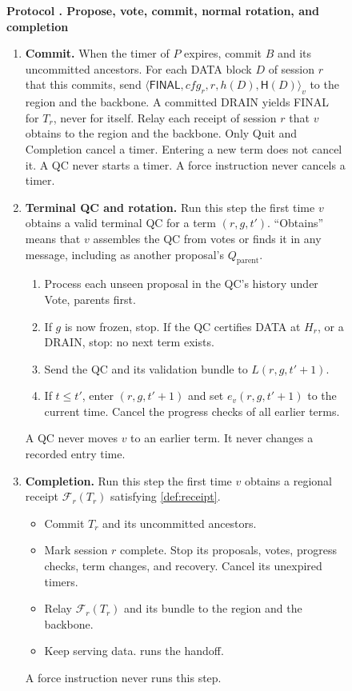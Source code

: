 \documentclass[11pt,a4paper]{article}
\newcommand{\RR}[1]{{\color{rrRed}#1}}
\newcommand{\FC}{\mathcal F}
\newcommand{\Hash}{\mathsf H}
\newcommand{\tagg}[1]{\ensuremath{\mathsf{#1}}}
\newcounter{protocol}
\newenvironment{protocol}[2]{\begin{figure}[htbp]\refstepcounter{protocol}\label{#1}
\begin{mdframed}[linewidth=.6pt,skipabove=0pt,skipbelow=0pt,
innertopmargin=7pt,innerbottommargin=7pt]\small
\textbf{Protocol \theprotocol. #2}\par\smallskip}{\end{mdframed}\end{figure}}
\begin{document}
\begin{protocol}{alg:steady}{Propose, vote, commit, normal rotation\RR{, and completion}}
\begin{enumerate}[label=\textbf{\arabic*)},itemsep=3pt]
\item \textbf{Commit.} When the timer of $P$ expires, commit $B$ and
its uncommitted ancestors. \RR{For each DATA block $D$ of session $r$
that this commits, send
$\langle\tagg{FINAL},\mathit{cfg}_r,r,h(D),\Hash(D)\rangle_v$ to the region
and the backbone. A committed DRAIN yields FINAL for $T_r$, never for
itself. Relay each receipt of session $r$ that $v$ obtains to the region
and the backbone.} Only Quit \RR{and Completion} cancel a timer. Entering a
new term does not cancel it. A QC never starts a timer. \RR{A force
instruction never cancels a timer.}

\item \textbf{Terminal QC and rotation.} Run this step the first time
$v$ obtains a valid terminal QC for a term $(r,g,t')$.
``Obtains'' means that $v$ assembles the QC from votes or finds it in
any message, including as another proposal's $Q_{\mathrm{parent}}$.
 \begin{enumerate}[label=(\alph*)]
 \item Process each unseen proposal in the QC's history under Vote,
       parents first.
 \item If $g$ is now frozen, stop. \RR{If the QC certifies DATA at
       $H_r$, or a DRAIN, stop: no next term exists.}
 \item Send the QC and its validation bundle to $L(r,g,t'+1)$.
 \item If $t\le t'$, enter $(r,g,t'+1)$ and set $e_v(r,g,t'+1)$ to the
       current time. Cancel the progress checks of all earlier
       terms.
 \end{enumerate}
 A QC never moves $v$ to an earlier term. It never changes a recorded
 entry time.

\item \RR{\textbf{Completion.} Run this step the first time $v$ obtains a
regional receipt $\FC_r(T_r)$ satisfying \cref{def:receipt}.}
 \begin{itemize}\color{rrRed}
 \item Commit $T_r$ and its uncommitted ancestors.
 \item Mark session $r$ complete. Stop its proposals, votes, progress
       checks, term changes, and recovery. Cancel its unexpired timers.
 \item Relay $\FC_r(T_r)$ and its bundle to the region and the backbone.
 \item Keep serving data.  runs the handoff.
 \end{itemize}
 \RR{A force instruction never runs this step.}
\end{enumerate}
\end{protocol}
\end{document}

